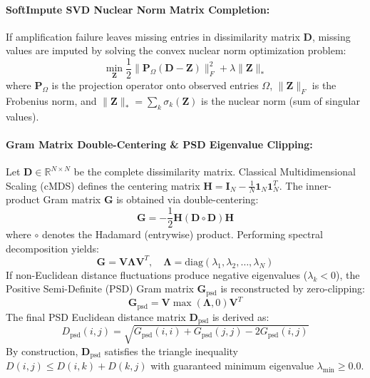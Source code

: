 \documentclass[11pt,a4paper]{article}
\begin{document}
\paragraph{SoftImpute SVD Nuclear Norm Matrix Completion:} If amplification failure leaves missing entries in dissimilarity matrix $\mathbf{D}$, missing values are imputed by solving the convex nuclear norm optimization problem:
\begin{equation}
\min_{\mathbf{Z}} \frac{1}{2} \|\mathbf{P}_\Omega(\mathbf{D} - \mathbf{Z})\|_F^2 + \lambda \|\mathbf{Z}\|_*
\end{equation}
where $\mathbf{P}_\Omega$ is the projection operator onto observed entries $\Omega$, $\|\mathbf{Z}\|_F$ is the Frobenius norm, and $\|\mathbf{Z}\|_* = \sum_k \sigma_k(\mathbf{Z})$ is the nuclear norm (sum of singular values).

\paragraph{Gram Matrix Double-Centering \& PSD Eigenvalue Clipping:}
Let $\mathbf{D} \in \mathbb{R}^{N \times N}$ be the complete dissimilarity matrix. Classical Multidimensional Scaling (cMDS) defines the centering matrix $\mathbf{H} = \mathbf{I}_N - \frac{1}{N} \mathbf{1}_N \mathbf{1}_N^T$. The inner-product Gram matrix $\mathbf{G}$ is obtained via double-centering:
\begin{equation}
\mathbf{G} = -\frac{1}{2} \mathbf{H} (\mathbf{D} \circ \mathbf{D}) \mathbf{H}
\end{equation}
where $\circ$ denotes the Hadamard (entrywise) product. Performing spectral decomposition yields:
\begin{equation}
\mathbf{G} = \mathbf{V} \mathbf{\Lambda} \mathbf{V}^T, \quad \mathbf{\Lambda} = \text{diag}(\lambda_1, \lambda_2, \dots, \lambda_N)
\end{equation}
If non-Euclidean distance fluctuations produce negative eigenvalues ($\lambda_k < 0$), the Positive Semi-Definite (PSD) Gram matrix $\mathbf{G}_{\text{psd}}$ is reconstructed by zero-clipping:
\begin{equation}
\mathbf{G}_{\text{psd}} = \mathbf{V} \max(\mathbf{\Lambda}, 0) \mathbf{V}^T
\end{equation}
The final PSD Euclidean distance matrix $\mathbf{D}_{\text{psd}}$ is derived as:
\begin{equation}
D_{\text{psd}}(i, j) = \sqrt{G_{\text{psd}}(i, i) + G_{\text{psd}}(j, j) - 2 G_{\text{psd}}(i, j)}
\end{equation}
By construction, $\mathbf{D}_{\text{psd}}$ satisfies the triangle inequality $D(i, j) \le D(i, k) + D(k, j)$ with guaranteed minimum eigenvalue $\lambda_{\text{min}} \ge 0.0$.
\end{document}
